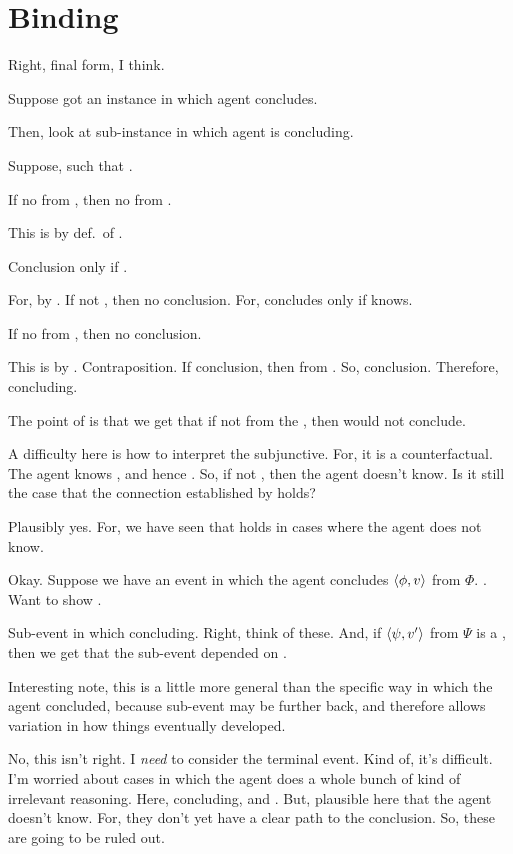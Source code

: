 \chapter{Binding}
\label{cha:binding}

\begin{note}
  Right, final form, I think.

  Suppose got an instance in which agent concludes.

  Then, look at sub-instance in which agent is concluding.

  Suppose, \requ{} such that \feedback{}.

  If no \ros{} from \agpe{}, then no \fc{} from \agpe{}.

  This is by def.\ of \fc{}.

  Conclusion only if \fc{}.

  For, by \feedback{}.
  If not \fc{}, then no conclusion.
  For, concludes only if knows.

  If no \fc{} from \agpe{}, then no conclusion.

  This is by \feedback{}.
  Contraposition.
  If conclusion, then \fc{} from \agpe{}.
  So, conclusion.
  Therefore, concluding.

  The point of \feedback{} is that we get that if not \fc{} from the \agpe{}, then would not conclude.
\end{note}

\begin{note}
  A difficulty here is how to interpret the subjunctive.
  For, it is a counterfactual.
  The agent knows \fc{}, and hence \ros{}.
  So, if not \ros{}, then the agent doesn't know.
  Is it still the case that the connection established by \feedback{} holds?

  Plausibly yes.
  For, we have seen that \feedback{} holds in cases where the agent does not know.
\end{note}

\begin{note}
  Okay.
  Suppose we have an event in which the agent concludes \(\langle \phi, v \rangle\) from \(\Phi\).
  \qWhyV{}.
  Want to show \ros{}.

  Sub-event in which concluding.
  Right, think of these.
  And, if \(\langle \psi, v' \rangle\) from \(\Psi\) is a \requ{}, then we get that the sub-event depended on \ros{}.

  Interesting note, this is a little more general than the specific way in which the agent concluded, because sub-event may be further back, and therefore allows variation in how things eventually developed.

  No, this isn't right.
  I \emph{need} to consider the terminal event.
  Kind of, it's difficult.
  I'm worried about cases in which the agent does a whole bunch of kind of irrelevant reasoning.
  Here, concluding, and .
  But, plausible here that the agent doesn't know.
  For, they don't yet have a clear path to the conclusion.
  So, these are going to be ruled out.
\end{note}

